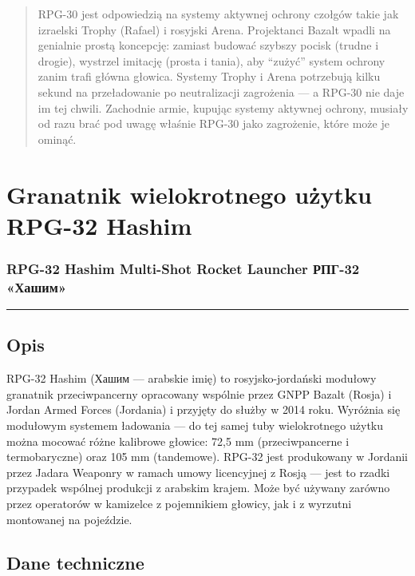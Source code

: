 \documentclass[12pt,openany,oneside]{book}
\begin{document}
\begin{quote}
RPG-30 jest odpowiedzią na systemy aktywnej ochrony czołgów takie jak
izraelski Trophy (Rafael) i rosyjski Arena. Projektanci Bazalt wpadli na
genialnie prostą koncepcję: zamiast budować szybszy pocisk (trudne i
drogie), wystrzel imitację (prosta i tania), aby ``zużyć'' system
ochrony zanim trafi główna głowica. Systemy Trophy i Arena potrzebują
kilku sekund na przeładowanie po neutralizacji zagrożenia --- a RPG-30
nie daje im tej chwili. Zachodnie armie, kupując systemy aktywnej
ochrony, musiały od razu brać pod uwagę właśnie RPG-30 jako zagrożenie,
które może je ominąć.
\end{quote}

\chapter{Granatnik wielokrotnego użytku RPG-32
Hashim}\label{granatnik-wielokrotnego-uux17cytku-rpg-32-hashim}

\subsection{RPG-32 Hashim Multi-Shot Rocket Launcher \textbar{} РПГ-32
«Хашим»}\label{rpg-32-hashim-multi-shot-rocket-launcher-ux440ux43fux433-32-ux445ux430ux448ux438ux43c}

\begin{center}\rule{0.5\linewidth}{0.5pt}\end{center}

\section{Opis}\label{opis-75}

RPG-32 Hashim (Хашим --- arabskie imię) to rosyjsko-jordański modułowy
granatnik przeciwpancerny opracowany wspólnie przez GNPP Bazalt (Rosja)
i Jordan Armed Forces (Jordania) i przyjęty do służby w 2014 roku.
Wyróżnia się modułowym systemem ładowania --- do tej samej tuby
wielokrotnego użytku można mocować różne kalibrowe głowice: 72,5 mm
(przeciwpancerne i termobaryczne) oraz 105 mm (tandemowe). RPG-32 jest
produkowany w Jordanii przez Jadara Weaponry w ramach umowy licencyjnej
z Rosją --- jest to rzadki przypadek wspólnej produkcji z arabskim
krajem. Może być używany zarówno przez operatorów w kamizelce z
pojemnikiem głowicy, jak i z wyrzutni montowanej na pojeździe.

\section{Dane techniczne}\label{dane-techniczne-75}
\end{document}
